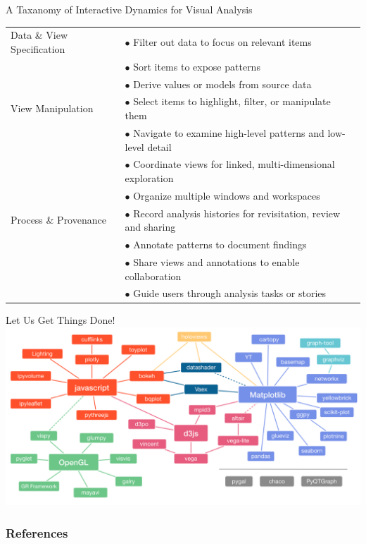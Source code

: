 \documentclass[notes, aspectratio=1610]{beamer}
\begin{document}
\begin{frame}{A Taxanomy of Interactive Dynamics for Visual Analysis}{}
	\footnotesize
	\centering
	\begin{table}
		\begin{tabular}{l|l}
			\hline
			\rowcolor{gray!25}
			Data \& View Specification
			& $\bullet$ Filter out data to focus on relevant items\\
			\rowcolor{gray!25}
			& $\bullet$ Sort items to expose patterns\\
			\rowcolor{gray!25} 
			& $\bullet$ Derive values or models from source data \\
			\hline
			View Manipulation
			& $\bullet$ Select items to highlight, filter, or manipulate them \\
			& $\bullet$ Navigate to examine high-level patterns and low-level detail\\
			& $\bullet$ Coordinate views for linked, multi-dimensional exploration\\ 
			& $\bullet$ Organize multiple windows and workspaces\\
			\hline
			\rowcolor{gray!25}
			Process \& Provenance
			& $\bullet$ Record analysis histories for revisitation, review and sharing\\
			\rowcolor{gray!25}
			& $\bullet$ Annotate patterns to document findings\\
			\rowcolor{gray!25}
			& $\bullet$ Share views and annotations to enable collaboration\\
			\rowcolor{gray!25}
			& $\bullet$ Guide users through analysis tasks or stories\\
			\hline
		\end{tabular}
	\end{table}
\end{frame}

\begin{frame}{Let Us Get Things Done!}{}
	\centering
	\includegraphics[height=0.8\textheight]{images/dviz_overview}
\end{frame}

\begin{frame}
	\frametitle{References}
	\printbibliography
 \end{frame} 
\end{document}
